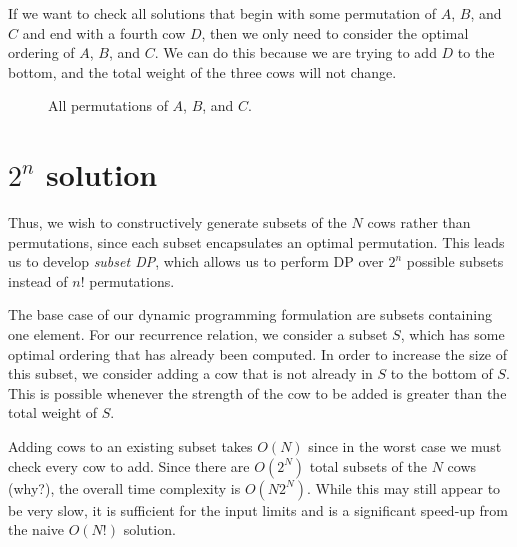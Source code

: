 \documentclass{article}
\begin{document}
If we want to check all solutions that begin with some permutation of $A$, $B$, and $C$ and end with a fourth cow $D$, then we only need to consider the optimal ordering of $A$, $B$, and $C$. We can do this because we are trying to add $D$ to the bottom, and the total weight of the three cows will not change.

\begin{figure}[h!]
\centering
{}
\caption{All permutations of $A$, $B$, and $C$.}
\end{figure}

\section{$2^n$ solution}

Thus, we wish to constructively generate subsets of the $N$ cows rather than permutations, since each subset encapsulates an optimal permutation. This leads us to develop \textit{subset DP}, which allows us to perform DP over $2^n$ possible subsets instead of $n!$ permutations.

The base case of our dynamic programming formulation are subsets containing one element. For our recurrence relation, we consider a subset $S$, which has some optimal ordering that has already been computed. In order to increase the size of this subset, we consider adding a cow that is not already in $S$ to the bottom of $S$. This is possible whenever the strength of the cow to be added is greater than the total weight of $S$. 

Adding cows to an existing subset takes $O(N)$ since in the worst case we must check every cow to add. Since there are $O(2^N)$ total subsets of the $N$ cows (why?), the overall time complexity is $O(N 2^N)$. While this may still appear to be very slow, it is sufficient for the input limits and is a significant speed-up from the naive $O(N!)$ solution.   
\end{document}
